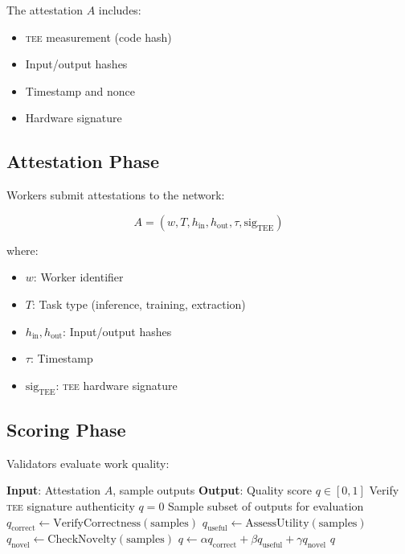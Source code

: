 \documentclass[11pt,letterpaper]{article}
\newcommand{\TEE}{\textsc{tee}}
\begin{document}
The attestation $A$ includes:
\begin{itemize}
    \item \TEE{} measurement (code hash)
    \item Input/output hashes
    \item Timestamp and nonce
    \item Hardware signature
\end{itemize}

\subsection{Attestation Phase}

Workers submit attestations to the network:

\begin{equation}
A = (w, T, h_{\text{in}}, h_{\text{out}}, \tau, \text{sig}_{\text{TEE}})
\end{equation}

where:
\begin{itemize}
    \item $w$: Worker identifier
    \item $T$: Task type (inference, training, extraction)
    \item $h_{\text{in}}, h_{\text{out}}$: Input/output hashes
    \item $\tau$: Timestamp
    \item $\text{sig}_{\text{TEE}}$: \TEE{} hardware signature
\end{itemize}

\subsection{Scoring Phase}

Validators evaluate work quality:

\begin{algorithm}[t]
\caption{Quality Scoring}
\label{alg:scoring}
\begin{algorithmic}[1]
\STATE \textbf{Input}: Attestation $A$, sample outputs
\STATE \textbf{Output}: Quality score $q \in [0, 1]$
\STATE Verify \TEE{} signature authenticity
    \RETURN $q = 0$
\ENDIF
\STATE Sample subset of outputs for evaluation
\STATE $q_{\text{correct}} \leftarrow \text{VerifyCorrectness}(\text{samples})$
\STATE $q_{\text{useful}} \leftarrow \text{AssessUtility}(\text{samples})$
\STATE $q_{\text{novel}} \leftarrow \text{CheckNovelty}(\text{samples})$
\STATE $q \leftarrow \alpha q_{\text{correct}} + \beta q_{\text{useful}} + \gamma q_{\text{novel}}$
\RETURN $q$
\end{algorithmic}
\end{algorithm}
\end{document}
